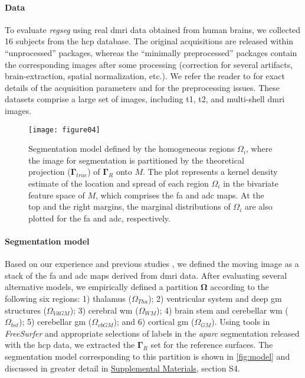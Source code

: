 \documentclass[3p,authoryear,fleqn]{elsarticle}
\providecommand{\omegaset}{\ensuremath{\boldsymbol{\Omega}}}
\providecommand{\gammaset}{\ensuremath{\boldsymbol{\Gamma}}}
\providecommand{\regseg}{\emph{regseg}}
\providecommand{\suppl}[1]{\href{http://figshare.com/s/459c26b4ee8211e493b306ec4bbcf141}{Supplemental Materials}, #1}
\begin{document}
\paragraph*{Data}
To evaluate \regseg{} using real \gls*{dmri} data obtained from human brains,
  we collected 16 subjects from the \gls*{hcp} database.
The original acquisitions are released within ``unprocessed'' packages, whereas
  the ``minimally preprocessed'' packages contain the corresponding images after
  some processing (correction for several artifacts, brain-extraction, spatial 
  normalization, etc.).
We refer the reader to \citep{essen_human_2012} for exact details of the acquisition
  parameters and \citep{glasser_minimal_2013} for the preprocessing issues.
These datasets comprise a large set of images, including \gls*{t1}, \gls*{t2}, and
  multi-shell \gls*{dmri} images.

\begin{figure}
\texttt{[image: figure04]}
\caption{Segmentation model defined by the homogeneous regions $\Omega_i$, where
  the image for segmentation is partitioned by the theoretical projection 
  ($\gammaset_{true}$) of $\gammaset_R$ onto $M$.
The plot represents a kernel density estimate of the location and spread of
  each region $\Omega_i$ in the bivariate feature space of $M$, which comprises 
  the \gls*{fa} and \gls*{adc} maps.
At the top and the right margins, the marginal distributions of $\Omega_i$ are also plotted for
  the \gls*{fa} and \gls*{adc}, respectively.
}\label{fig:model}
\end{figure}

\paragraph*{Segmentation model}
Based on our experience   and previous studies \citep{ennis_orthogonal_2006},
  we defined the moving image as a stack of the \gls*{fa} and \gls*{adc} maps derived
  from \gls*{dmri} data.
After evaluating several alternative models, we empirically defined a partition \omegaset{}
  according to the following six regions:
  1) thalamus ($\Omega_{Tha}$);
  2) ventricular system and deep \gls*{gm} structures ($\Omega_{VdGM}$);
  3) cerebral \gls*{wm} ($\Omega_{WM}$);
  4) brain stem and cerebellar \gls*{wm} ($\Omega_{bst}$);
  5) cerebellar \gls*{gm} ($\Omega_{cbGM}$); and
  6) cortical \gls*{gm} ($\Omega_{GM}$).
Using tools in \emph{FreeSurfer} and appropriate selections of labels in the 
  \emph{aparc} segmentation released with the \gls*{hcp} data, we extracted the $\gammaset_R$ set for the
  reference surfaces.
The segmentation model corresponding to this partition is shown in \autoref{fig:model}
  and discussed in greater detail in \suppl{section S4}.
\end{document}
